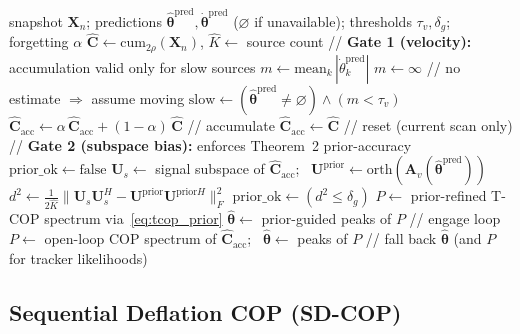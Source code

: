 \documentclass[journal]{IEEEtran}
\newcommand{\vect}[1]{\boldsymbol{#1}}
\newcommand{\mat}[1]{\mathbf{#1}}
\begin{document}
\begin{algorithm}[t]
\caption{Gated T-COP refinement (single scan $n$)}
\label{alg:gate}
\begin{algorithmic}[1]
\REQUIRE snapshot $\mat{X}_n$; predictions $\hat{\vect{\theta}}^{\mathrm{pred}},\dot{\vect{\theta}}^{\mathrm{pred}}$ ($\varnothing$ if unavailable); thresholds $\tau_v,\delta_g$; forgetting $\alpha$
\STATE $\hat{\mat{C}} \leftarrow \mathrm{cum}_{2\rho}(\mat{X}_n)$, \quad $\hat{K} \leftarrow$ source count
\STATE // \textbf{Gate 1 (velocity):} accumulation valid only for slow sources
\IF{$\hat{\vect{\theta}}^{\mathrm{pred}} \neq \varnothing$}
    \STATE $m \leftarrow \mathrm{mean}_k\, |\dot{\theta}_k^{\mathrm{pred}}|$
\ELSE
    \STATE $m \leftarrow \infty$ \hfill // no estimate $\Rightarrow$ assume moving
\ENDIF
\STATE $\mathrm{slow} \leftarrow (\hat{\vect{\theta}}^{\mathrm{pred}} \neq \varnothing) \wedge (m < \tau_v)$
    \STATE $\hat{\mat{C}}_{\mathrm{acc}} \leftarrow \alpha\,\hat{\mat{C}}_{\mathrm{acc}} + (1-\alpha)\,\hat{\mat{C}}$ \hfill // accumulate
\ELSE
    \STATE $\hat{\mat{C}}_{\mathrm{acc}} \leftarrow \hat{\mat{C}}$ \hfill // reset (current scan only)
\ENDIF
\STATE // \textbf{Gate 2 (subspace bias):} enforces Theorem~2 prior-accuracy
\STATE $\mathrm{prior\_ok} \leftarrow \mathrm{false}$
\IF{$\mathrm{slow} \wedge (\hat{\vect{\theta}}^{\mathrm{pred}} \neq \varnothing)$}
    \STATE $\mat{U}_s \leftarrow$ signal subspace of $\hat{\mat{C}}_{\mathrm{acc}}$; \ $\mat{U}^{\mathrm{prior}} \leftarrow \mathrm{orth}(\mat{A}_v(\hat{\vect{\theta}}^{\mathrm{pred}}))$
    \STATE $d^2 \leftarrow \tfrac{1}{2\hat{K}}\| \mat{U}_s\mat{U}_s^H - \mat{U}^{\mathrm{prior}}\mat{U}^{\mathrm{prior}H} \|_F^2$
    \STATE $\mathrm{prior\_ok} \leftarrow (d^2 \leq \delta_g)$
\ENDIF
{}
    \STATE $P \leftarrow$ prior-refined T-COP spectrum via~\eqref{eq:tcop_prior}
    \STATE $\hat{\vect{\theta}} \leftarrow$ prior-guided peaks of $P$ \hfill // engage loop
\ELSE
    \STATE $P \leftarrow$ open-loop COP spectrum of $\hat{\mat{C}}_{\mathrm{acc}}$; \ $\hat{\vect{\theta}} \leftarrow$ peaks of $P$ \hfill // fall back
\ENDIF
\RETURN $\hat{\vect{\theta}}$ (and $P$ for tracker likelihoods)
\end{algorithmic}
\end{algorithm}

\subsection{Sequential Deflation COP (SD-COP)}
\label{sec:sdcop}
\end{document}

